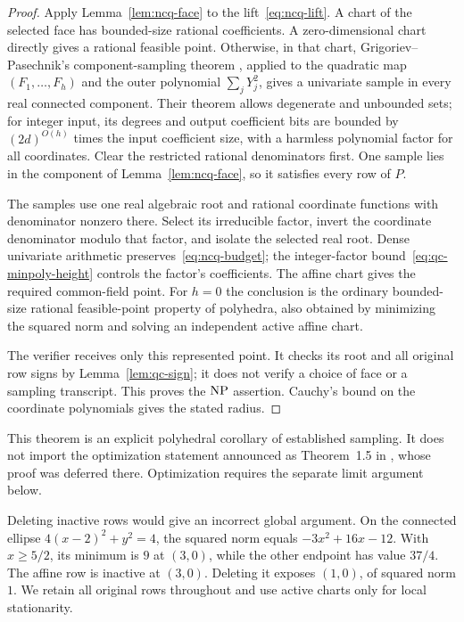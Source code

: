 \begin{proof}
Apply Lemma~\ref{lem:ncq-face} to the lift~\eqref{eq:ncq-lift}. A chart
of the selected face has bounded-size rational coefficients. A
zero-dimensional chart directly gives a rational feasible point. Otherwise,
in that chart,
Grigoriev--Pasechnik's component-sampling theorem
\cite[Theorem~1.2]{GrigorievPasechnik2005}, applied to the quadratic map
$(F_1,\ldots,F_h)$ and the outer polynomial $\sum_jY_j^2$, gives a
univariate sample in every real connected component. Their theorem allows
degenerate and unbounded sets; for integer input, its degrees and output
coefficient bits are bounded by $(2d)^{O(h)}$ times the input coefficient
size, with a harmless polynomial factor for all coordinates. Clear the
restricted rational denominators first. One sample lies in the component
of Lemma~\ref{lem:ncq-face}, so it satisfies every row of $P$.

The samples use one real algebraic root and rational coordinate functions
with denominator nonzero there. Select its irreducible factor, invert the
coordinate denominator modulo that factor, and isolate the selected real
root. Dense univariate arithmetic preserves~\eqref{eq:ncq-budget}; the
integer-factor bound~\eqref{eq:qc-minpoly-height} controls the factor's
coefficients. The affine chart gives the required common-field point. For
$h=0$ the conclusion is the ordinary bounded-size rational feasible-point
property of polyhedra, also obtained by minimizing the squared norm and
solving an independent active affine chart.

The verifier receives only this represented point. It checks its root and
all original row signs by Lemma~\ref{lem:qc-sign}; it does not verify a
choice of face or a sampling transcript. This proves the $\mathrm{NP}$ assertion.
Cauchy's bound on the coordinate polynomials gives the stated radius.
\end{proof}

This theorem is an explicit polyhedral corollary of established sampling.
It does not import the optimization statement announced as Theorem~1.5 in
\cite{GrigorievPasechnik2005}, whose proof was deferred there. Optimization
requires the separate limit argument below.

Deleting inactive rows would give an incorrect global argument. On the
connected ellipse $4(x-2)^2+y^2=4$, the squared norm equals
$-3x^2+16x-12$. With $x\ge5/2$, its minimum is $9$ at $(3,0)$, while
the other endpoint has value $37/4$. The affine row is inactive at $(3,0)$.
Deleting it exposes $(1,0)$, of squared norm $1$. We retain all original
rows throughout and use active charts only for local stationarity.

